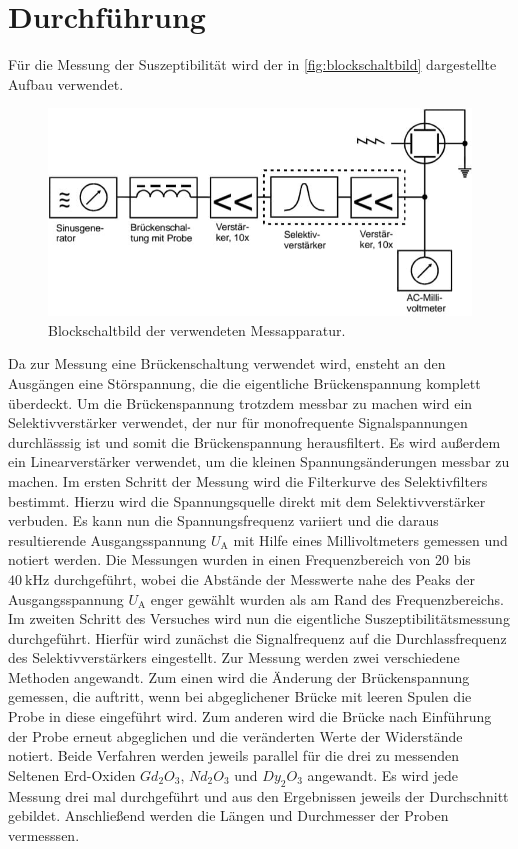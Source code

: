 \section{Durchführung}
\label{sec:Durchführung}
Für die Messung der Suszeptibilität wird der in \autoref{fig:blockschaltbild} dargestellte Aufbau verwendet.

\begin{figure}[H]
	\centering
	\includegraphics[width=0.6\linewidth]{data/blockschaltbild.jpeg}
	\caption{Blockschaltbild der verwendeten Messapparatur.}
	\label{fig:blockschaltbild}
\end{figure}
\noindent
Da zur Messung eine Brückenschaltung verwendet wird, ensteht an den Ausgängen eine Störspannung, die die eigentliche Brückenspannung komplett überdeckt. Um die Brückenspannung
trotzdem messbar zu machen wird ein Selektivverstärker verwendet, der nur für monofrequente Signalspannungen durchlässsig ist und somit die Brückenspannung herausfiltert. Es wird 
außerdem ein Linearverstärker verwendet, um die kleinen Spannungsänderungen messbar zu machen.
\newline \newline
Im ersten Schritt der Messung wird die Filterkurve des Selektivfilters bestimmt. Hierzu wird die Spannungsquelle direkt mit dem Selektivverstärker verbuden. Es kann nun die Spannungsfrequenz
variiert und die daraus resultierende Ausgangsspannung $U_{\text{A}}$ mit Hilfe eines Millivoltmeters gemessen und notiert werden. Die Messungen wurden in einen Frequenzbereich von 20 bis
$\SI{40}{\kilo\hertz}$ durchgeführt, wobei die Abstände der Messwerte nahe des Peaks der Ausgangsspannung $U_{\text{A}}$ enger gewählt wurden als am Rand des Frequenzbereichs.
\newline \newline
Im zweiten Schritt des Versuches wird nun die eigentliche Suszeptibilitätsmessung durchgeführt. Hierfür wird zunächst die Signalfrequenz auf die Durchlassfrequenz des Selektivverstärkers
eingestellt. Zur Messung werden zwei verschiedene Methoden angewandt. Zum einen wird die Änderung der Brückenspannung gemessen, die auftritt, wenn bei abgeglichener Brücke mit leeren Spulen
die Probe in diese eingeführt wird. Zum anderen wird die Brücke nach Einführung der Probe erneut abgeglichen und die veränderten Werte der Widerstände notiert.
\newline
Beide Verfahren werden jeweils parallel für die drei zu messenden Seltenen Erd-Oxiden $Gd_2O_3$, $Nd_2O_3$ und $Dy_2O_3$ angewandt. Es wird jede Messung drei mal durchgeführt und aus den
Ergebnissen jeweils der Durchschnitt gebildet. Anschließend werden die Längen und Durchmesser der Proben vermesssen.